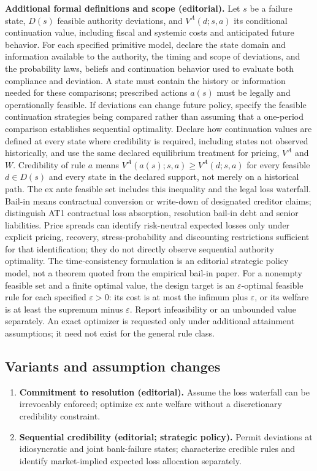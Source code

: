 \documentclass[11pt,a4paper]{article}
\begin{document}
\textbf{Additional formal definitions and scope (editorial).} Let \(s\) be a failure state, \(D(s)\) feasible authority deviations, and \(V^{A}(d;s,a)\) its conditional continuation value, including fiscal and systemic costs and anticipated future behavior. For each specified primitive model, declare the state domain and information available to the authority, the timing and scope of deviations, and the probability laws, beliefs and continuation behavior used to evaluate both compliance and deviation. A state must contain the history or information needed for these comparisons; prescribed actions \(a(s)\) must be legally and operationally feasible. If deviations can change future policy, specify the feasible continuation strategies being compared rather than assuming that a one-period comparison establishes sequential optimality. Declare how continuation values are defined at every state where credibility is required, including states not observed historically, and use the same declared equilibrium treatment for pricing, \(V^{A}\) and \(W\). Credibility of rule \(a\) means \(V^{A}(a(s);s,a)\geq V^{A}(d;s,a)\) for every feasible \(d\in D(s)\) and every state in the declared support, not merely on a historical path. The ex ante feasible set includes this inequality and the legal loss waterfall. Bail-in means contractual conversion or write-down of designated creditor claims; distinguish AT1 contractual loss absorption, resolution bail-in debt and senior liabilities. Price spreads can identify risk-neutral expected losses only under explicit pricing, recovery, stress-probability and discounting restrictions sufficient for that identification; they do not directly observe sequential authority optimality. The time-consistency formulation is an editorial strategic policy model, not a theorem quoted from the empirical bail-in paper. For a nonempty feasible set and a finite optimal value, the design target is an \(\varepsilon\)-optimal feasible rule for each specified \(\varepsilon>0\): its cost is at most the infimum plus \(\varepsilon\), or its welfare is at least the supremum minus \(\varepsilon\). Report infeasibility or an unbounded value separately. An exact optimizer is requested only under additional attainment assumptions; it need not exist for the general rule class.
\subsection*{Variants and assumption changes}
\begin{enumerate}
\item \textbf{Commitment to resolution (editorial).} Assume the loss waterfall can be irrevocably enforced; optimize ex ante welfare without a discretionary credibility constraint.
\item \textbf{Sequential credibility (editorial; strategic policy).} Permit deviations at idiosyncratic and joint bank-failure states; characterize credible rules and identify market-implied expected loss allocation separately.
\end{enumerate}
\end{document}
